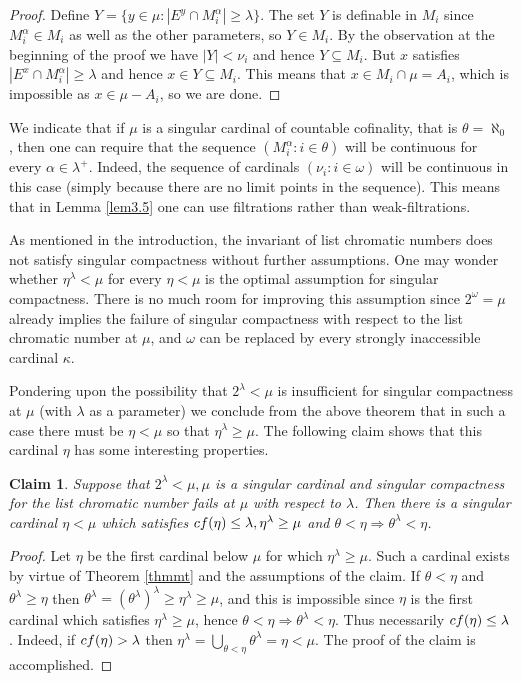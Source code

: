 \documentclass[11pt]{amsart}
\newtheorem{claim}[theorem]{Claim}
\theoremstyle{definition}
\theoremstyle{remark}
\newcommand{\cf}{{\rm cf}}
\begin{document}
\begin{proof}
Define $Y=\{y\in\mu:|E^y\cap M^\alpha_i|\geq\lambda\}$.
The set $Y$ is definable in $M_i$ since $M^\alpha_i\in M_i$ as well as the other parameters, so $Y\in M_i$.
By the observation at the beginning of the proof we have $|Y|<\nu_i$ and hence $Y\subseteq M_i$.
But $x$ satisfies $|E^x\cap M^\alpha_i|\geq\lambda$ and hence $x\in Y\subseteq M_i$.
This means that $x\in M_i\cap\mu=A_i$, which is impossible as $x\in\mu-A_i$, so we are done.
\end{proof}

We indicate that if $\mu$ is a singular cardinal of countable cofinality, that is $\theta=\aleph_0$, then one can require that the sequence $(M^\alpha_i:i\in\theta)$ will be continuous for every $\alpha\in\lambda^+$.
Indeed, the sequence of cardinals $(\nu_i:i\in\omega)$ will be continuous in this case (simply because there are no limit points in the sequence).
This means that in Lemma \ref{lem3.5} one can use filtrations rather than weak-filtrations.

As mentioned in the introduction, the invariant of list chromatic numbers does not satisfy singular compactness without further assumptions.
One may wonder whether $\eta^\lambda<\mu$ for every $\eta<\mu$ is the optimal assumption for singular compactness.
There is no much room for improving this assumption since $2^\omega=\mu$ already implies the failure of singular compactness with respect to the list chromatic number at $\mu$, and $\omega$ can be replaced by every strongly inaccessible cardinal $\kappa$.

Pondering upon the possibility that $2^\lambda<\mu$ is insufficient for singular compactness at $\mu$ (with $\lambda$ as a parameter) we conclude from the above theorem that in such a case there must be $\eta<\mu$ so that $\eta^\lambda\geq\mu$.
The following claim shows that this cardinal $\eta$ has some interesting properties.

\begin{claim}
\label{clmoptimal} Suppose that $2^\lambda<\mu, \mu$ is a singular cardinal and singular compactness for the list chromatic number fails at $\mu$ with respect to $\lambda$.
Then there is a singular cardinal $\eta<\mu$ which satisfies $\cf(\eta)\leq\lambda, \eta^\lambda\geq\mu$ and $\theta<\eta\Rightarrow\theta^\lambda<\eta$.
\end{claim}

\begin{proof}
Let $\eta$ be the first cardinal below $\mu$ for which $\eta^\lambda\geq\mu$.
Such a cardinal exists by virtue of Theorem \ref{thmmt} and the assumptions of the claim.
If $\theta<\eta$ and $\theta^\lambda\geq\eta$ then $\theta^\lambda=(\theta^\lambda)^\lambda\geq\eta^\lambda\geq\mu$, and this is impossible since $\eta$ is the first cardinal which satisfies $\eta^\lambda\geq\mu$, hence $\theta<\eta\Rightarrow\theta^\lambda<\eta$.
Thus necessarily $\cf(\eta)\leq\lambda$.
Indeed, if $\cf(\eta)>\lambda$ then $\eta^\lambda=\bigcup_{\theta<\eta}\theta^\lambda=\eta<\mu$.
The proof of the claim is accomplished.
\end{proof}
\end{document}
